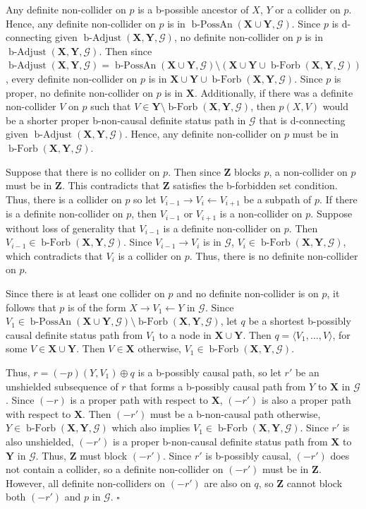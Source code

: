 \documentclass[letterpaper]{article}
\theoremstyle{definition}
\newenvironment{proofof}[1][]{\begin{trivlist}
   \item[\hskip \labelsep {\bfseries Proof of #1.}]}{\hfill{}$\square$\end{trivlist}}
\theoremstyle{remark}
\DeclareMathOperator{\bPossAn}{b-PossAn}
\DeclareMathOperator{\bForbb}{b-Forb}
\DeclareMathOperator{\bAdjust}{b-Adjust}
\newcommand{\bforb}{the b-forbidden set condition}
\newcommand{\g}[1][G]{\mathcal{#1}}
\newcommand{\badjustb}[2][X,Y]{\bAdjust(\mathbf{#1},#2)}
\newcommand{\bfb}[2][X,Y]{\bForbb(\mathbf{#1},#2)}
\begin{document}
\begin{proofof}[Theorem~\ref{theorem:constructive-set-mpdag}]
Any definite non-collider on $p$ is a b-possible ancestor of $X$, $Y$ or a collider on $p$. Hence, any definite non-collider on $p$ is in $\bPossAn(\mathbf{X} \cup \mathbf{Y},\g)$. Since $p$ is d-connecting given $\badjustb{\g}$, no definite non-collider on $p$ is in $\badjustb{\g}$. Then since  $\badjustb{\g} = \bPossAn(\mathbf{X} \cup \mathbf{Y}, \g)\setminus(\mathbf{X} \cup \mathbf{Y} \cup \bfb{\g})$, every definite non-collider on $p$ is in $\mathbf{X} \cup \mathbf{Y} \cup \bfb{\g}$.
Since $p$ is proper, no definite non-collider on $p$ is in $\mathbf{X}$. Additionally, if there was a definite non-collider $V$ on $p$ such that $V \in \mathbf{Y} \setminus \bfb{\g}$, then $p(X,V)$ would be a shorter proper b-non-causal definite status path in $\g$ that is d-connecting given $\badjustb{\g}$. Hence, any definite non-collider on $p$ must be in $\bfb{\g}$. 

Suppose that there is no collider on $p$. Then since $\mathbf{Z}$ blocks $p$, a non-collider on $p$ must be in $\mathbf{Z}$. This contradicts that $\mathbf{Z}$ satisfies \bforb{}.
Thus, there is a collider on $p$ so let $V_{i-1} \rightarrow V_{i} \leftarrow V_{i+1}$ be a subpath of $p$. If there is a definite non-collider on $p$, then $V_{i-1}$ or $V_{i+1}$ is a non-collider on $p$. Suppose without loss of generality that $V_{i-1}$ is a definite non-collider on $p$. Then $V_{i-1} \in \bfb{\g}$. Since $V_{i-1} \rightarrow V_i$ is in $\g$, $V_i \in \bfb{\g}$, which contradicts that $V_i$ is a collider on $p$.
Thus, there is no definite non-collider on $p$. 

Since there is at least one collider on $p$ and no definite non-collider is on $p$, it follows that $p$ is of the form $ X \rightarrow V_1 \leftarrow Y$ in $\g$. Since $V_1 \in \bPossAn(\mathbf{X} \cup \mathbf{Y},\g) \setminus \bfb{\g}$, let $q$ be a shortest b-possibly causal definite status path from $V_1$ to a node in $\mathbf{X} \cup \mathbf{Y}$. Then $q = \langle V_1, \dots , V\rangle$, for some $V \in \mathbf{X} \cup \mathbf{Y}$. Then $V \in \mathbf{X}$ otherwise, $V_1 \in \bfb{\g} $.

Thus, $r = (-p)(Y,V_1) \oplus q$ is a b-possibly causal path, so let $r'$ be an unshielded subsequence of $r$ that forms a b-possibly causal path from $Y$ to $\mathbf{X}$ in $\g$. Since $(-r)$ is a proper path with respect to $\mathbf{X}$, $(-r')$ is also a proper path with respect to $\mathbf{X}$. Then $(-r')$ must be a b-non-causal path otherwise, $Y \in \bfb{\g}$ which also implies $V_1 \in \bfb{\g}$. 
Since $r'$ is also unshielded, $(-r')$ is a proper b-non-causal definite status path from $\mathbf{X}$ to $\mathbf{Y}$ in $\g$. Thus, $\mathbf{Z}$ must block $(-r')$. Since $r'$ is b-possibly causal, $(-r')$ does not contain a collider, so a definite non-collider on $(-r')$ must be in $\mathbf{Z}$. However, all definite non-colliders on $(-r')$ are also on $q$, so $\mathbf{Z}$ cannot block both $(-r')$ and $p$ in $\g$.
\end{proofof}
\end{document}
